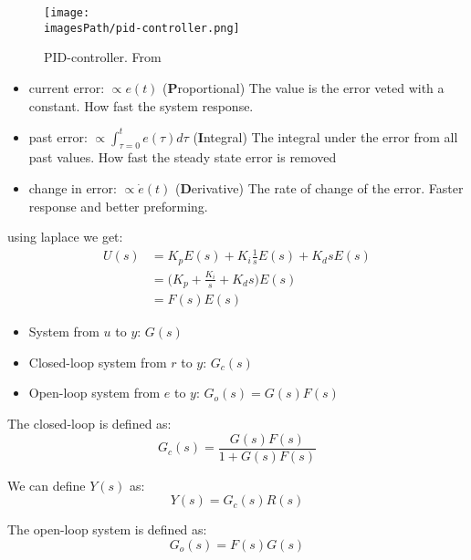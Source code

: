 \begin{figure}[!h]
    \centering
    \texttt{[image: \\imagesPath/pid-controller.png]}
    \caption{PID-controller. From \cite{}}
    \label{fig:pid-controller}
\end{figure}

\begin{itemize}
    \item current error: $\propto e(t)$ (\textbf{P}roportional) \newline 
    The value is the error veted with a constant. How fast the system response.
    \item past error: $\propto \int_{\tau=0}^t e(\tau)d\tau$ (\textbf{I}ntegral) \newline
    The integral under the error from all past values. How fast the steady state error is removed
    \item change in error: $\propto \dot{e}(t)$ (\textbf{D}erivative) \newline
    The rate of change of the error. Faster response and better preforming.
\end{itemize}

using laplace we get:
\begin{align*}
    U(s) &= K_p E(s) + K_i\frac{1}{s}E(s) + K_d s E(s) \\
    &= \Big(K_p + \frac{K_i}{s} + K_d s \Big) E(s) \\
    &= F(s)E(s)
\end{align*}

\begin{itemize}
    \item System from $u$ to $y$: $G(s)$
    \item Closed-loop system from $r$ to $y$: $G_c(s)$
    \item Open-loop system from $e$ to $y$: $G_o(s) = G(s)F(s)$
\end{itemize}

The closed-loop is defined as:
\begin{equation*}
    G_c(s) = \frac{G(s)F(s)}{1+G(s)F(s)}
\end{equation*}

We can define $Y(s)$ as:
\begin{equation*}
    Y(s) = G_c(s) R(s)    
\end{equation*}

The open-loop system is defined as:
\begin{equation*}
    G_o(s) = F(s)G(s)
\end{equation*}

